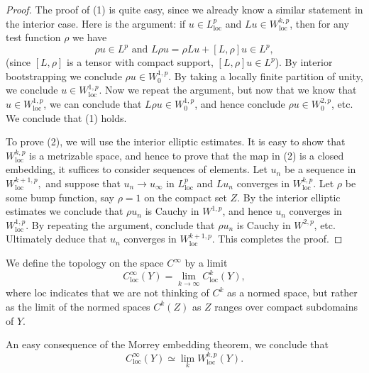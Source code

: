  \begin{proof}
   The proof of (1) is quite easy, since we already know a similar
   statement in the interior case. Here is the argument: if $u\in
   L^{p}_{\text{loc}}$ and $Lu\in W^{k,p}_{\text{loc}}$, then for any
   test function $\rho$ we have
   \begin{equation*}\tag{$\ast$}
     \rho u\in L^{p}\text{ and }L\rho u=\rho Lu+[L,\rho]u\in L^{p},
   \end{equation*}
   (since $[L,\rho]$ is a tensor with compact support, $[L,\rho]u\in
   L^{p}$). By interior bootstrapping we conclude $\rho u\in
   W^{1,p}_{0}$. By taking a locally finite partition of unity, we
   conclude $u\in W^{1,p}_{\text{loc}}$. Now we repeat the argument,
   but now that we know that $u\in W^{1,p}_{\text{loc}}$, we can conclude
   that $L\rho u\in W^{1,p}_{0}$, and hence conclude $\rho u\in
   W^{2,p}_{0}$, etc. We conclude that (1) holds.

   To prove (2), we will use the interior elliptic estimates. It is
   easy to show that $W^{k,p}_{\text{loc}}$ is a metrizable space, and
   hence to prove that the map in (2) is a closed embedding, it
   suffices to consider sequences of elements. Let $u_{n}$ be a
   sequence in $W^{k+1,p}_{\text{loc}},$ and suppose that
   $u_{n}\to u_{\infty}$ in $L^{p}_{\text{loc}}$ and $Lu_{n}$
   converges in $W^{k,p}_{\text{loc}}$. Let $\rho$ be some bump
   function, say $\rho=1$ on the compact set $Z$. By the interior
   elliptic estimates we conclude that $\rho u_{n}$ is Cauchy in
   $W^{1,p}$, and hence $u_{n}$ converges in 
   $W^{1,p}_{\text{loc}}$. By repeating the argument, conclude that
   $\rho u_{n}$ is Cauchy in $W^{2,p}$, etc. Ultimately deduce that
   $u_{n}$ converges in $W^{k+1,p}_{\text{loc}}$. This completes the proof.         
 \end{proof}
 \begin{defn}
   We define the topology on the space $C^{\infty}$ by a limit 
   \begin{equation*}
     C^{\infty}_{\text{loc}}(Y)=\lim_{k\to\infty}C^{k}_{\text{loc}}(Y),
   \end{equation*}
   where $\text{loc}$ indicates that we are not thinking of $C^{k}$ as
   a normed space, but rather as the limit of the normed spaces
   $C^{k}(Z)$ as $Z$ ranges over compact subdomains of $Y$.

   An easy consequence of the Morrey embedding theorem, we conclude
   that
   \begin{equation*}\tag{$\ast$}
     C^{\infty}_{\text{loc}}(Y)\simeq \lim_{k}W^{k,p}_{\text{loc}}(Y).
   \end{equation*}
 \end{defn}

